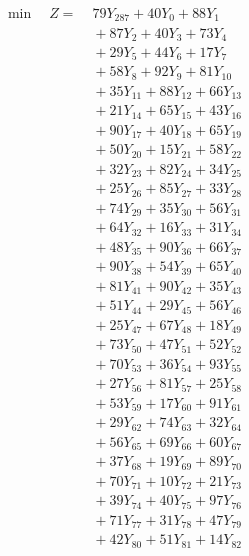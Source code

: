 \documentclass[a4paper,10pt]{article}
\begin{document}
\allowdisplaybreaks
{\small
\begin{align}
\min \quad Z = &\; 79 Y_{287} + 40 Y_{0} + 88 Y_{1} \\[0.3ex]
&\;  + 87 Y_{2} + 40 Y_{3} + 73 Y_{4} \\[0.3ex]
&\;  + 29 Y_{5} + 44 Y_{6} + 17 Y_{7} \\[0.3ex]
&\;  + 58 Y_{8} + 92 Y_{9} + 81 Y_{10} \\[0.3ex]
&\;  + 35 Y_{11} + 88 Y_{12} + 66 Y_{13} \\[0.3ex]
&\;  + 21 Y_{14} + 65 Y_{15} + 43 Y_{16} \\[0.3ex]
&\;  + 90 Y_{17} + 40 Y_{18} + 65 Y_{19} \\[0.3ex]
&\;  + 50 Y_{20} + 15 Y_{21} + 58 Y_{22} \\[0.3ex]
&\;  + 32 Y_{23} + 82 Y_{24} + 34 Y_{25} \\[0.3ex]
&\;  + 25 Y_{26} + 85 Y_{27} + 33 Y_{28} \\[0.5ex]\allowbreak
&\;  + 74 Y_{29} + 35 Y_{30} + 56 Y_{31} \\[0.3ex]
&\;  + 64 Y_{32} + 16 Y_{33} + 31 Y_{34} \\[0.3ex]
&\;  + 48 Y_{35} + 90 Y_{36} + 66 Y_{37} \\[0.3ex]
&\;  + 90 Y_{38} + 54 Y_{39} + 65 Y_{40} \\[0.3ex]
&\;  + 81 Y_{41} + 90 Y_{42} + 35 Y_{43} \\[0.3ex]
&\;  + 51 Y_{44} + 29 Y_{45} + 56 Y_{46} \\[0.3ex]
&\;  + 25 Y_{47} + 67 Y_{48} + 18 Y_{49} \\[0.3ex]
&\;  + 73 Y_{50} + 47 Y_{51} + 52 Y_{52} \\[0.3ex]
&\;  + 70 Y_{53} + 36 Y_{54} + 93 Y_{55} \\[0.3ex]
&\;  + 27 Y_{56} + 81 Y_{57} + 25 Y_{58} \\[0.5ex]\allowbreak
&\;  + 53 Y_{59} + 17 Y_{60} + 91 Y_{61} \\[0.3ex]
&\;  + 29 Y_{62} + 74 Y_{63} + 32 Y_{64} \\[0.3ex]
&\;  + 56 Y_{65} + 69 Y_{66} + 60 Y_{67} \\[0.3ex]
&\;  + 37 Y_{68} + 19 Y_{69} + 89 Y_{70} \\[0.3ex]
&\;  + 70 Y_{71} + 10 Y_{72} + 21 Y_{73} \\[0.3ex]
&\;  + 39 Y_{74} + 40 Y_{75} + 97 Y_{76} \\[0.3ex]
&\;  + 71 Y_{77} + 31 Y_{78} + 47 Y_{79} \\[0.3ex]
&\;  + 42 Y_{80} + 51 Y_{81} + 14 Y_{82} \\[0.3ex]

\end{align}}
\end{document}
